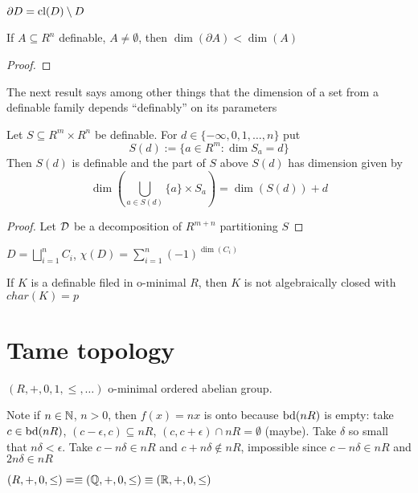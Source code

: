 \documentclass[11pt]{article}
\begin{document}
\(\partial D=\operatorname{\text{cl}}(D)\setminus D\)


\begin{theorem}[]
If \(A\subseteq R^n\) definable, \(A\neq\emptyset\), then
\(\dim(\partial A)<\dim(A)\)
\end{theorem}

\begin{proof}

\end{proof}





The next result says among other things that the dimension of a set from a definable family
depends ``definably'' on its parameters

\begin{proposition}[]
Let \(S\subseteq R^m\times R^n\) be definable. For \(d\in\{-\infty,0,1,\dots,n\}\) put
\begin{equation*}
S(d):=\{a\in R^m:\dim S_a=d\}
\end{equation*}
Then \(S(d)\) is definable and the part of \(S\) above \(S(d)\) has dimension given by
\begin{equation*}
\dim\left( \bigcup_{a\in S(d)}\{a\}\times S_a \right)=\dim(S(d))+d
\end{equation*}
\end{proposition}

\begin{proof}
Let \(\mathcal{D}\) be a decomposition of \(R^{m+n}\) partitioning \(S\)
\end{proof}

\(D=\bigsqcup_{i=1}^n C_i\), \(\chi(D)=\sum_{i=1}^n(-1)^{\dim(C_i)}\)

If \(K\) is a definable filed in o-minimal \(R\), then \(K\) is not algebraically closed with \(char(K)=p\)

\section{Tame topology}
\label{sec:org7024657}
\((R,+,0,1,\le,\dots)\) o-minimal ordered abelian group.

Note if \(n\in\mathbb{N}\), \(n>0\), then \(f(x)=nx\) is onto because \(\operatorname{bd}(nR)\) is empty:
take \(c\in\operatorname{bd}(nR)\), \((c-\epsilon,c)\subseteq nR\), \((c,c+\epsilon)\cap nR=\emptyset\) (maybe). Take \(\delta\) so small that \(n\delta<\epsilon\).
Take \(c-n\delta\in nR\) and \(c+n\delta\notin nR\), impossible since \(c-n\delta\in nR\) and \(2n\delta\in nR\)

\((R,+,0,\le)=\equiv(\mathbb{Q},+,0,\le)\equiv(\mathbb{R},+,0,\le)\)
\end{document}
